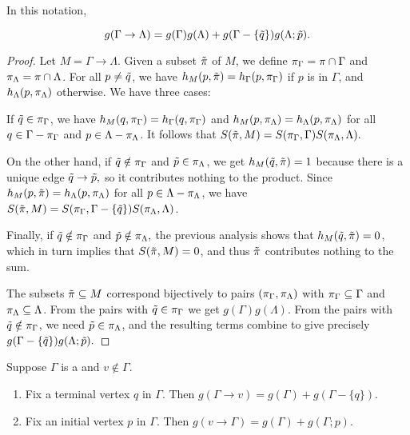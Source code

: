 \begin{prop}
	In this notation,
	\begin{enumrealm}\begin{equation*}
		g(\Gamma \rightarrow \Lambda) = g(\Gamma)g(\Lambda) + g(\Gamma - \{\tilde{q}\})g(\Lambda; \tilde{p}).
	\end{equation*}\end{enumrealm}
\end{prop}
\begin{proof}
	Let $M = \Gamma \rightarrow \Lambda$.
	Given a subset $\tilde{\pi}$ of $M$, we define $\pi_\Gamma = \pi \cap \Gamma$ and $\pi_\Lambda = \pi \cap \Lambda$.
	For all $p \neq \tilde{q}$, we have $h_M(p, \tilde{\pi}) = h_\Gamma(p, \pi_\Gamma)$ if $p$ is in $\Gamma$, and $h_\Lambda(p, \pi_\Lambda)$ otherwise.
	We have three cases:

	If $\tilde{q} \in \pi_\Gamma$, we have $h_M(q, \pi_\Gamma) = h_\Gamma(q, \pi_\Gamma)$
	and $h_M(p, \pi_\Lambda) = h_\Lambda(p, \pi_\Lambda)$ for all $q \in \Gamma - \pi_\Gamma$ and $p \in \Lambda - \pi_\Lambda$.
	It follows that $S(\tilde{\pi}, M) = S(\pi_\Gamma, \Gamma)S(\pi_\Lambda, \Lambda).$
	
	On the other hand, if $\tilde{q}\notin\pi_\Gamma$ and $\tilde{p} \in \pi_\Lambda$, we get $h_M(\tilde{q}, \tilde{\pi}) = 1$
	because there is a unique edge $\tilde{q} \rightarrow \tilde{p},$ so it contributes nothing to the product.
	Since $h_M(p, \tilde{\pi}) = h_\Lambda(p, \pi_\Lambda)$ for all $p \in \Lambda - \pi_\Lambda$,
	we have $S(\tilde{\pi}, M) = S(\pi_\Gamma, \Gamma - \{\tilde{q}\})S(\pi_\Lambda, \Lambda)$.
	
	Finally, if $\tilde{q} \notin \pi_\Gamma$ and $\tilde{p}\notin\pi_\Lambda,$ the previous analysis shows that $h_M(\tilde{q}, \tilde{\pi}) = 0$,
	which in turn implies that $S(\tilde{\pi}, M) = 0$, and thus $\tilde{\pi}$ contributes nothing to the sum.
	
	The subsets $\tilde{\pi} \subseteq M$ correspond bijectively to pairs $(\pi_\Gamma, \pi_\Lambda)$
	with $\pi_\Gamma \subseteq \Gamma$ and $\pi_\Lambda \subseteq \Lambda$.
	From the pairs with $\tilde{q} \in \pi_\Gamma$ we get $g(\Gamma)g(\Lambda)$.
	From the pairs with $\tilde{q} \notin \pi_\Gamma$, we need $\tilde{p} \in \pi_\Lambda$,
	and the resulting terms combine to give precisely $g(\Gamma - \{\tilde{q}\})g(\Lambda; \tilde{p}).$
\end{proof}

\begin{cor} Suppose $\Gamma$ is a  and $v \notin \Gamma$.\listspace
	\begin{enumerate} \listspace
		\item Fix a terminal vertex $q$ in $\Gamma$.
Then $g(\Gamma \rightarrow v) = g(\Gamma) + g(\Gamma - \{q\}).$
		\item Fix an initial vertex $p$ in $\Gamma$.
Then $g(v \rightarrow \Gamma) = g(\Gamma) + g(\Gamma; p).$
	\end{enumerate}\textspace
\end{cor}

